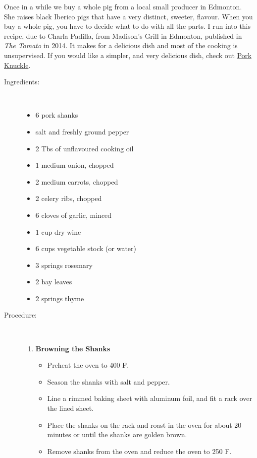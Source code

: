\documentclass[11pt,letterpaper]{article}
\begin{document}


Once in a while we buy a whole pig from a local small producer in Edmonton. She raises black Iberico pigs that have a very distinct, sweeter, flavour. When you buy a whole pig, you have to decide what to do with all the parts. I run into this recipe, due to Charla Padilla, from Madison's Grill in Edmonton, published in {\it The Tomato} in 2014. It makes for a delicious dish and most of the cooking is unsupervised. If you would like a simpler, and very delicious dish, check out \href{PorkKnuckle.html}{Pork Knuckle}.


\begin{description}

\item[Ingredients:]\ \\
	\begin{itemize}
	\item 6 pork shanks
	\item	salt and freshly ground pepper
	\item 2 Tbs of unflavoured cooking oil
	\item 1 medium onion, chopped
	\item 2 medium carrots, chopped
	\item 2 celery ribs, chopped
	\item 6 cloves of garlic, minced
	\item 1 cup dry wine
	\item 6 cups vegetable stock (or water)
	\item 3 springs rosemary
	\item 2 bay leaves
	\item 2 springs thyme
	\end{itemize}

\item[Procedure:]\ \\

	\begin{enumerate}
	\item {\bf Browning the Shanks}
	\begin{itemize}
	\item Preheat the oven to 400 F.
	\item Season the shanks with salt and pepper.
	\item Line a rimmed baking sheet with aluminum foil, and fit a rack over the lined sheet.
	\item Place the shanks on the rack and roast in the oven for about 20 minutes or until the shanks are golden brown.
	\item Remove shanks from the oven and reduce the oven to 250 F.
	\end{itemize}


\end{enumerate}
\end{description}
\end{document}

